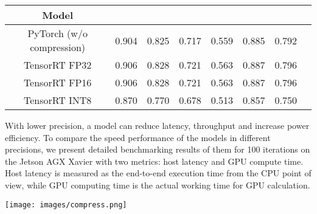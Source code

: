 \documentclass{ieeeaccess}
\newcommand{\DHA}{BlazeNeo-DHA\xspace}
\newcommand{\CleanDatasetName}{NeoPolyp-Clean\xspace}
\begin{document}
\begin{table*}[ht!]
    \centering
    \caption{Accuracy metrics on the \CleanDatasetName test set for \DHA models in different precisions}
    \label{tab:compress_acc}
    \begin{tabular}{@{} c | r r r r r r r@{}}
        \toprule
        
        \multicolumn{1}{c|}{Model} & \multicolumn{1}{c}{} & \multicolumn{1}{c}{} & \multicolumn{1}{c}{} & \multicolumn{1}{c}{} & \multicolumn{1}{c}{} & \multicolumn{1}{c}{} \\
        \midrule
        \midrule
        PyTorch (w/o compression)                   & 0.904                                   & 0.825                                  & 0.717                                   & 0.559                                  & 0.885                                   & 0.792                                  \\
        TensorRT FP32              & 0.906                                   & 0.828                                  & 0.721                                   & 0.563                                  & 0.887                                   & 0.796                                  \\
        TensorRT FP16              & 0.906                                   & 0.828                                  & 0.721                                   & 0.563                                  & 0.887                                   & 0.796                                  \\
        TensorRT INT8              & 0.870                                   & 0.770                                  & 0.678                                   & 0.513                                  & 0.857                                   & 0.750                                  \\
        
        \bottomrule
    \end{tabular}
\end{table*}

With lower precision, a model can reduce latency, throughput and increase power efficiency. To compare the speed performance of the models in different precisions, we present detailed benchmarking results of them for 100 iterations on the Jetson AGX Xavier with two metrics: host latency and GPU compute time. Host latency is measured as the end-to-end execution time from the CPU point of view, while GPU computing time is the actual working time for GPU calculation.
\begin{figure*}[ht!]
    \begin{center}
        \texttt{[image: images/compress.png]}
    \end{center}
    \caption{Qualitative comparison of \DHA models in different precisions: (a) image, (b) ground truth, (c) Pytorch, (d) TensorRT FP32, (e) TensorRT FP16, (f) TensorRT INT8.}
    \label{fig:compress}
\end{figure*}
\end{document}
